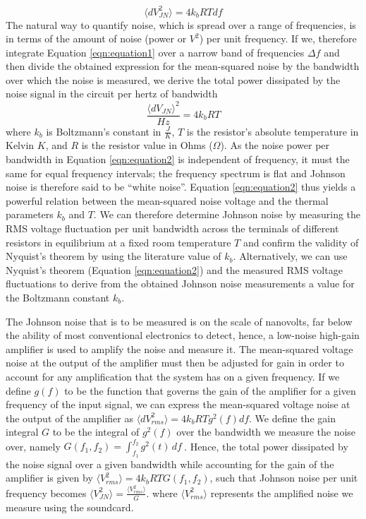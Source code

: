 \begin{linenumbers}
\begin{equation}
\label{eqn:equation1}
    \langle dV_{JN}^2\rangle = 4k_bRTdf
\end{equation}
The natural way to quantify noise, which is spread over a range of frequencies, is in terms of the amount of noise (power or $V^2$) per unit frequency. If we, therefore integrate Equation \ref{eqn:equation1} over a narrow band of frequencies $\Delta f$ and then divide the obtained expression for the mean-squared noise by the bandwidth over which the noise is measured, we derive the total power dissipated by the noise signal in the circuit per hertz of bandwidth
\begin{equation}
\label{eqn:equation2}
 \frac{\langle dV_{JN} \rangle ^2}{Hz} = 4k_{b}RT
\end{equation}
where $k_{b}$ is Boltzmann's constant in $\frac{J}{K}$, $T$ is the resistor's absolute temperature in Kelvin $K$, and $R$ is the resistor value in Ohms ($\Omega$). As the noise power  per bandwidth in Equation \ref{eqn:equation2} is independent of frequency, it must the same for equal frequency intervals; the frequency spectrum is flat and Johnson noise is therefore said to be “white noise”. 
Equation \ref{eqn:equation2} thus yields a powerful relation between the mean-squared noise voltage and the thermal parameters $k_b$ and $T$.
We can therefore determine Johnson noise by measuring the RMS voltage fluctuation per unit bandwidth across the terminals of different resistors in equilibrium at a fixed room temperature $T$ and confirm the validity of Nyquist's theorem by using the literature value of $k_b$. Alternatively, we can use Nyquist's theorem (Equation \ref{eqn:equation2}) and the measured RMS voltage fluctuations to derive from the obtained Johnson noise measurements a value for the Boltzmann constant $k_b$.

The Johnson noise that is to be measured is on the scale of nanovolts, far below the ability of most conventional electronics to detect, hence, a low-noise high-gain amplifier is used to amplify the noise and measure it. 
The mean-squared voltage noise at the output of the amplifier must then be adjusted for gain in order to account for any amplification that the system has on a given frequency. If we define $g(f)$ to be the function that governs the gain of the amplifier for a given frequency of the input signal, we can express the mean-squared voltage noise at the output of the amplifier as $\langle dV_{rms}^2 \rangle= 4k_{b}RTg^2(f)df$. We define the gain integral $G$ to be the integral of $g^2(f)$ over the bandwidth we measure the noise over, namely $G(f_1, f_2)= \int_{f_1}^{f_2} g^2(t)\,df\ $. Hence, the total power dissipated by the noise signal over a given bandwidth while accounting for the gain of the amplifier is given by $\langle V_{rms}^2 \rangle= 4k_{b}RTG(f_1, f_2)$, such that Johnson noise per unit frequency becomes
$\langle V_{JN}^2 \rangle  =\frac{\langle V_{rms}^2 \rangle}{G}$. where $\langle V_{rms}^2 \rangle$ represents the amplified noise we measure using the soundcard. 


\end{linenumbers}
